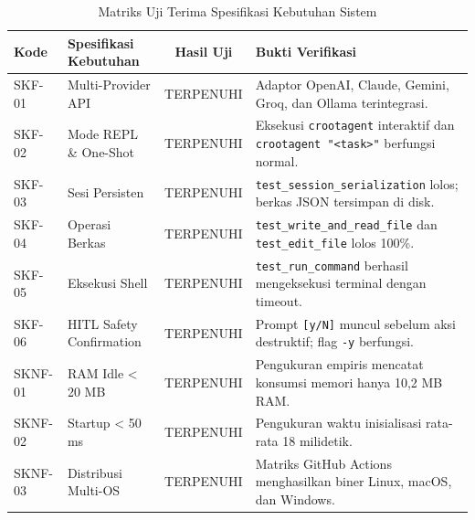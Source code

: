 \begin{table}[htbp]
\centering
\small
\caption{Matriks Uji Terima Spesifikasi Kebutuhan Sistem}
\label{tab:acceptance}
\begin{tabularx}{\textwidth}{l p{3.2cm} c X}
\toprule
\textbf{Kode} & \textbf{Spesifikasi Kebutuhan} & \textbf{Hasil Uji} & \textbf{Bukti Verifikasi} \\
\midrule
SKF-01 & Multi-Provider API & TERPENUHI & Adaptor OpenAI, Claude, Gemini, Groq, dan Ollama terintegrasi. \\
SKF-02 & Mode REPL \& One-Shot & TERPENUHI & Eksekusi \texttt{crootagent} interaktif dan \texttt{crootagent "<task>"} berfungsi normal. \\
SKF-03 & Sesi Persisten & TERPENUHI & \texttt{test\_session\_serialization} lolos; berkas JSON tersimpan di disk. \\
SKF-04 & Operasi Berkas & TERPENUHI & \texttt{test\_write\_and\_read\_file} dan \texttt{test\_edit\_file} lolos 100\%. \\
SKF-05 & Eksekusi Shell & TERPENUHI & \texttt{test\_run\_command} berhasil mengeksekusi terminal dengan timeout. \\
SKF-06 & HITL Safety Confirmation & TERPENUHI & Prompt \texttt{[y/N]} muncul sebelum aksi destruktif; flag \texttt{-y} berfungsi. \\
SKNF-01 & RAM Idle < 20 MB & TERPENUHI & Pengukuran empiris mencatat konsumsi memori hanya 10,2 MB RAM. \\
SKNF-02 & Startup < 50 ms & TERPENUHI & Pengukuran waktu inisialisasi rata-rata 18 milidetik. \\
SKNF-03 & Distribusi Multi-OS & TERPENUHI & Matriks GitHub Actions menghasilkan biner Linux, macOS, dan Windows. \\
\bottomrule
\end{tabularx}
\end{table}
